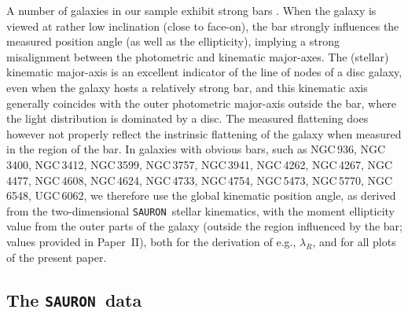 \documentclass[useAMS,usenatbib,usegraphicx]{mn2e}
\newcommand{\Sauron}{\texttt{SAURON}}
\begin{document}
A number of galaxies in our sample exhibit strong bars \citep[e.g. NGC\,936, NGC\,6548, see][hereafter Paper~II]{Krajnovic+11}. When the
galaxy is viewed at rather low inclination (close to face-on), the bar strongly influences the
measured position angle (as well as the ellipticity), implying a strong
misalignment between the photometric and kinematic major-axes.
The (stellar) kinematic major-axis is an excellent indicator of the line of nodes of
a disc galaxy, even when the galaxy hosts a relatively strong bar, and this
kinematic axis generally coincides with the outer photometric major-axis outside the bar, 
where the light distribution is dominated by a disc. The measured flattening
does however not properly reflect the instrinsic flattening of the galaxy when
measured in the region of the bar. In galaxies with obvious bars, such as NGC\,936, NGC\,3400, NGC\,3412, 
NGC\,3599, NGC\,3757, NGC\,3941, NGC\,4262, NGC\,4267, NGC\,4477, NGC\,4608, NGC\,4624, NGC\,4733, NGC\,4754, NGC\,5473, 
NGC\,5770, NGC\,6548, UGC\,6062, we therefore use the global kinematic
position angle, as derived from the two-dimensional \Sauron\ stellar kinematics, 
with the moment ellipticity value from the outer parts of the galaxy 
(outside the region influenced by the bar; values provided in Paper~II), 
both for the derivation of e.g.,
$\lambda_R$, and for all plots of the present paper.

\subsection{The \Sauron\ data} 
\end{document}
